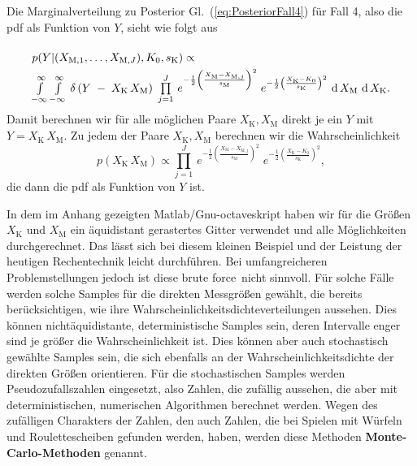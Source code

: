 Die Marginalverteilung zu Posterior Gl.~(\ref{eq:PosteriorFall4}) für Fall 4, also
die pdf als Funktion von $Y$, sieht wie folgt aus
\begin{equation}
\arraycolsep=2.0pt\def\arraystretch{2.0}
\begin{array}{l}
p(Y | (X_{\mathrm{M},1}, \dots, X_{\mathrm{M},J}), K_0, s_\mathrm{K}) \propto \\
\int\limits_{-\infty}^\infty \int\limits_{-\infty}^\infty \,
\delta \left( Y \; - \; X_\mathrm{K} \, X_\mathrm{M}\right)
\; \prod\limits_{j=1}^J  \,
e^{-\frac{1}{2} \left(\frac{ X_\mathrm{M} - X_{\mathrm{M},j} }{s_\mathrm{M}} \right)^2}
\;  e^{-\frac{1}{2} \left(\frac{X_\mathrm{K} - K_0}{s_\mathrm{K}} \right)^2}  \,
\operatorname{d}X_\mathrm{M} \, \operatorname{d}X_\mathrm{K}.
\end{array}
\label{marginalPosteriorFall4}
\end{equation}
Damit berechnen wir für alle möglichen Paare $X_\mathrm{K}, X_\mathrm{M}$ direkt je ein
$Y$ mit $Y = X_\mathrm{K} \, X_\mathrm{M}$. Zu jedem der Paare $X_\mathrm{K}, X_\mathrm{M}$
berechnen wir die Wahrscheinlichkeit
$$
p(X_\mathrm{K} \, X_\mathrm{M}) \propto \prod\limits_{j=1}^J  \,
e^{-\frac{1}{2} \left(\frac{ X_\mathrm{M} - X_{\mathrm{M},j} }{s_\mathrm{M}} \right)^2}
\;  e^{-\frac{1}{2} \left(\frac{X_\mathrm{K} - K_0}{s_\mathrm{K}} \right)^2},
$$
die dann die pdf als Funktion von $Y$ ist.

In dem im Anhang gezeigten Matlab/Gnu-octaveskript haben wir für die Größen
$X_\mathrm{K}$ und $X_\mathrm{M}$ ein äquidistant gerastertes Gitter verwendet und alle
Möglichkeiten durchgerechnet. Das lässt sich bei diesem kleinen Beispiel und der Leistung
der heutigen Rechentechnik leicht durchführen. Bei umfangreicheren Problemstellungen jedoch
ist diese \glqq brute force\grqq ~nicht sinnvoll. Für solche Fälle
werden solche Samples für die direkten Messgrößen
gewählt, die bereits berücksichtigen, wie ihre Wahrscheinlichkeitsdichteverteilungen aussehen.
Dies können nichtäquidistante, deterministische Samples sein, deren Intervalle enger sind
je größer die Wahrscheinlichkeit ist. Dies können aber auch stochastisch gewählte Samples sein,
die sich ebenfalls an der Wahrscheinlichkeitsdichte der direkten Größen orientieren.
Für die stochastischen Samples werden Pseudozufallszahlen eingesetzt, also Zahlen, die zufällig
aussehen, die aber mit deterministischen, numerischen Algorithmen berechnet werden.
Wegen des zufälligen Charakters der Zahlen, den auch Zahlen, die bei Spielen mit Würfeln und
Roulettescheiben gefunden werden, haben, werden diese Methoden \textbf{Monte-Carlo-Methoden}
genannt.



